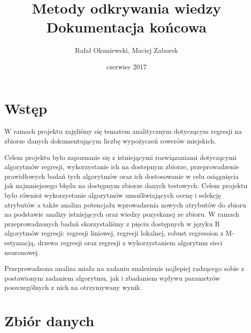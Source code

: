 \documentclass[a4paper,12pt]{article}
\title{Metody odkrywania wiedzy\\\Large{Dokumentacja końcowa}}
\author{Rafał Okuniewski, Maciej Zaborek}
\date{czerwiec 2017}
\begin{document}
 
\maketitle
 
\section{Wstęp}
W ramach projektu zajęliśmy się tematem analitycznym dotyczącym regresji na zbiorze danych dokumentującym liczbę wypożyczeń rowerów miejskich.
 
 Celem projektu było zapoznanie się z istniejącymi rozwiązaniami dotyczącymi algorytmów regresji, wykorzystanie ich na dostepnym zbiorze, przeprowadzenie prawidłowych badań tych algorytmów oraz ich dostosowanie w celu osiągnięcia jak najmniejszego błędu na dostępnym zbiorze danych testowych.
 Celem projektu było również wykorzystanie algorytmów umożliwiających ocenę i selekcję atrybutów a także analiza potencjału wprowadzenia nowych atrybutów do zbioru na podstawie analizy istniejących oraz wiedzy pozyskanej ze zbioru.
W ramach przeprowadzonych badań skorzystaliśmy z pięciu dostępnych w języku R algorytmów regresji: regresji liniowej, regresji lokalnej, robust regression z M-estymacją, drzewa regresji oraz regresji z wykorzystaniem algorytmu sieci neuronowej.
 
Przeprowadzona analiza miała na zadaniu znalezienie najlepiej radzącego sobie z postawionym zadaniem algorytmu, jak i zbadaniem wpływu parametrów poszczególnych z nich na otrzymywany wynik.

\section{Zbiór danych}
\end{document}

